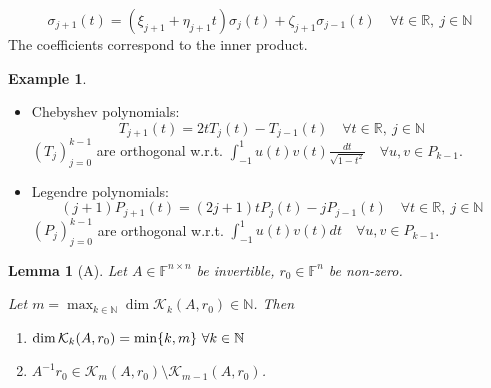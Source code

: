 \documentclass[12pt]{article}
\newtheorem{lemma}[theorem]{Lemma}
\theoremstyle{definition}
\newtheorem*{example*}{Example}
\theoremstyle{remark}
\numberwithin{equation}{section}
\newcommand{\F}{\mathbb{F}}
\newcommand{\R}{\mathbb{R}}
\newcommand{\N}{\mathbb{N}}
\newcommand{\K}{\mathcal{K}}
\DeclarePairedDelimiter{\set}{\{}{\}}
\begin{document}
\begin{equation*}
  \sigma_{j+1}(t) = (\xi_{j+1} + \eta_{j+1} t) \sigma_j(t) + \zeta_{j+1} \sigma_{j-1}(t) \quad \forall t \in \R,\ j \in \N
\end{equation*}
The coefficients correspond to the inner product.
\begin{example*}
  \begin{itemize}
    \item Chebyshev polynomials:
      \begin{equation*}
        T_{j+1}(t) = 2t T_j(t) - T_{j-1}(t) \quad \forall t \in \R,\ j \in \N
      \end{equation*}
      $(T_j)_{j=0}^{k-1}$ are orthogonal w.r.t. $\int_{-1}^1 u(t)v(t) \frac{dt}{\sqrt{1-t^2}} \quad \forall u,v \in P_{k-1}$.

    \item Legendre polynomials:
      \begin{equation*}
        (j+1) P_{j+1}(t) = (2j + 1) t P_j(t) - j P_{j-1}(t) \quad \forall t \in \R,\ j \in \N
      \end{equation*}
      $(P_j)_{j=0}^{k-1}$ are orthogonal w.r.t. $\int_{-1}^1 u(t)v(t) dt \quad \forall u,v \in P_{k-1}$.
  \end{itemize}
\end{example*}
\addtocounter{theorem}{-1}
\begin{lemma}[A]
  Let $A \in \F^{n\times n}$ be invertible, $r_0 \in \F^n$ be non-zero.

  Let $m = \max_{k \in \N} \dim \K_k(A,r_0) \in \N$. Then
  \begin{enumerate}[label=(\roman*)]
    \item $\dim \K_k(A,r_0) = \min\set{k,m}\ \forall k \in \N$
    \item $A^{-1} r_0 \in \K_m(A,r_0) \setminus \K_{m-1}(A,r_0)$.
  \end{enumerate}
\end{lemma}
\end{document}
